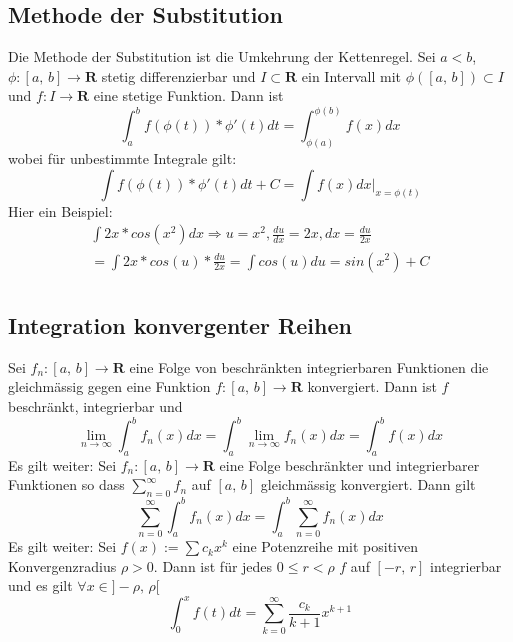 \documentclass[8pt]{extarticle}
\begin{document}
\begin{multicols*}{3}
\subsection{Methode der Substitution}

Die Methode der Substitution ist die Umkehrung der Kettenregel. Sei $a < b$, $\phi:[a,\,b] \rightarrow \mathbf{R}$
stetig differenzierbar und $I \subset \mathbf{R}$ ein Intervall mit $\phi([a,\,b]) \subset I$ und $f: I \rightarrow \mathbf{R}$ eine stetige Funktion.
Dann ist
$$
  \int_a^b f(\phi(t)) * \phi'(t) dt = \int_{\phi(a)}^{\phi(b)} f(x) dx
$$
wobei für unbestimmte Integrale gilt:
$$
  \int f(\phi(t)) * \phi'(t) dt + C = \int f(x) dx \Big|_{x = \phi(t)}
$$
Hier ein Beispiel:
\begin{align*}
  \int 2x * cos(x^2) dx \Rightarrow u = x^2, \frac{du}{dx} = 2x, dx = \frac{du}{2x}\\
  = \int 2x * cos(u) * \frac{du}{2x} = \int cos(u) du = sin(x^2) + C\\
\end{align*}

\subsection{Integration konvergenter Reihen}

Sei $f_n:[a,\,b] \rightarrow \mathbf{R}$ eine Folge von beschränkten integrierbaren
Funktionen die gleichmässig gegen eine Funktion $f:[a,\,b] \rightarrow \mathbf{R}$ konvergiert.
Dann ist $f$ beschränkt, integrierbar und
$$
  \lim_{n \rightarrow \infty} \int_a^b f_n(x) dx = \int_a^b \lim_{n \rightarrow \infty} f_n(x) dx = \int_a^b f(x) dx
$$
Es gilt weiter: Sei $f_n:[a,\,b] \rightarrow \mathbf{R}$ eine Folge beschränkter und integrierbarer Funktionen so dass $\sum_{n = 0}^\infty f_n$ auf $[a,\,b]$
gleichmässig konvergiert. Dann gilt
$$
  \sum_{n = 0}^\infty \int_a^b f_n(x) dx = \int_a^b \sum_{n = 0}^\infty f_n(x) dx
$$
Es gilt weiter: Sei $f(x) := \sum c_k x^k$ eine Potenzreihe mit positiven Konvergenzradius $\rho > 0$.
Dann ist für jedes $0 \leq r < \rho$ $f$ auf $[-r,\,r]$ integrierbar und es gilt $\forall x \in ]-\rho,\,\rho[$
$$
  \int_0^x f(t) dt = \sum_{k = 0}^\infty \frac{c_k}{k+1} x^{k+1}
$$
%
%


\end{multicols*}
\end{document}
